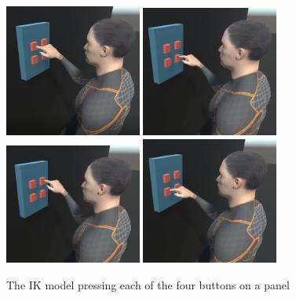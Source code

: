 \begin{figure}[h!]
    \centering
    \captionsetup{justification=centering}
    \includegraphics[width=0.4\textwidth]{grafika/h_ik_1.png}
    \includegraphics[width=0.4\textwidth]{grafika/h_ik_2.png}
    \includegraphics[width=0.4\textwidth]{grafika/h_ik_3.png}
    \includegraphics[width=0.4\textwidth]{grafika/h_ik_4.png}
    \caption{The IK model pressing each of the four buttons on a panel}
    \label{fig:h_ik_multiple}
\end{figure}



